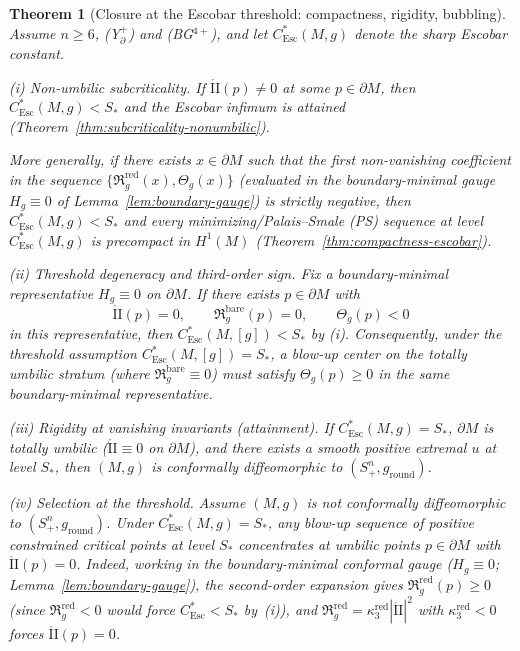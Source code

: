 \documentclass[11pt,reqno,a4paper]{amsart}
\numberwithin{equation}{section}
\theoremstyle{plain}
\newtheorem{theorem}{Theorem}[section]
\newcommand{\Esc}{\ensuremath{\mathrm{Esc}}}
\theoremstyle{remark}
\theoremstyle{plain}
\begin{document}
\begin{theorem}[Closure at the Escobar threshold: compactness, rigidity, bubbling]\label{thm:closure-escobar}
Assume $n\ge6$, \textup{(Y$^+_{\partial}$)} and \textup{(BG$^{4+}$)}, and let $C_{\Esc}^*(M,g)$ denote the sharp Escobar constant.

\smallskip
\noindent\textup{(i) Non-umbilic subcriticality.}
If $\mathring{\mathrm{II}}(p)\neq0$ at some $p\in\partial M$,
then $C_{\Esc}^*(M,g)<S_\ast$ and the Escobar infimum is attained
(Theorem~\ref{thm:subcriticality-nonumbilic}).

More generally, if there exists $x\in\partial M$ such that the first non-vanishing coefficient in the sequence
$\{\mathfrak R_g^{\mathrm{red}}(x), \Theta_g(x)\}$
(evaluated in the boundary-minimal gauge $H_g\equiv0$ of Lemma~\ref{lem:boundary-gauge})
is strictly negative, then $C_{\Esc}^*(M,g)<S_\ast$ and every minimizing/Palais--Smale (PS) sequence at level $C_{\Esc}^*(M,g)$
is precompact in $H^1(M)$ (Theorem~\ref{thm:compactness-escobar}).

\smallskip
\noindent\textup{(ii) Threshold degeneracy and third-order sign.}
Fix a boundary-minimal representative $H_g\equiv0$ on $\partial M$.
If there exists $p\in\partial M$ with
\[
\mathring{\mathrm{II}}(p)=0,
\qquad
\mathfrak R_g^{\mathrm{bare}}(p)=0,
\qquad
\Theta_g(p)<0
\]
in this representative, then $C_{\Esc}^*(M,[g])<S_\ast$ by \textup{(i)}.
Consequently, under the threshold assumption $C_{\Esc}^*(M,[g])=S_\ast$,
a blow-up center on the totally umbilic stratum (where
$\mathfrak R_g^{\mathrm{bare}}\equiv0$) must satisfy
$\Theta_g(p)\ge0$ in the same boundary-minimal representative.

\smallskip
\noindent\textup{(iii) Rigidity at vanishing invariants (attainment).}
If $C_{\Esc}^*(M,g)=S_\ast$, $\partial M$ is totally umbilic
($\mathring{\mathrm{II}}\equiv0$ on $\partial M$),
and there exists a smooth positive extremal $u$ at level $S_\ast$, then
$(M,g)$ is conformally diffeomorphic to $(S^n_+,g_{\mathrm{round}})$.

\smallskip
\noindent\textup{(iv) Selection at the threshold.}
Assume $(M,g)$ is not conformally diffeomorphic to $(S^n_+,g_{\mathrm{round}})$.
Under $C_{\Esc}^*(M,g)=S_\ast$, any blow-up sequence of \emph{positive constrained critical points} at level $S_\ast$ concentrates at
umbilic points $p\in\partial M$ with $\mathring{\mathrm{II}}(p)=0$.
Indeed, working in the boundary-minimal conformal gauge ($H_g\equiv0$; Lemma~\ref{lem:boundary-gauge}),
the second-order expansion gives $\mathfrak R_g^{\mathrm{red}}(p)\ge0$
(since $\mathfrak R_g^{\mathrm{red}}<0$ would force $C^*_{\Esc}<S_\ast$ by~(i)),
and $\mathfrak R_g^{\mathrm{red}}=\kappa_3^{\mathrm{red}}|\mathring{\mathrm{II}}|^2$ with $\kappa_3^{\mathrm{red}}<0$
forces $\mathring{\mathrm{II}}(p)=0$.


\end{theorem}
\end{document}
